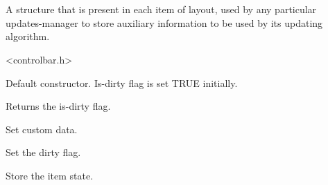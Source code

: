 %
%


\section{}\label{cbupdatemgrdata}


A structure that is present in each item of layout,
used by any particular updates-manager to store
auxiliary information to be used by its updating algorithm.




<controlbar.h>




\label{cbupdatemgrdatacbupdatemgrdata}


Default constructor. Is-dirty flag is set TRUE initially.


\label{cbupdatemgrdataisdirty}


Returns the is-dirty flag.


\label{cbupdatemgrdatasetcustomdata}


Set custom data.


\label{cbupdatemgrdatasetdirty}


Set the dirty flag.


\label{cbupdatemgrdatastoreitemstate}


Store the item state.

